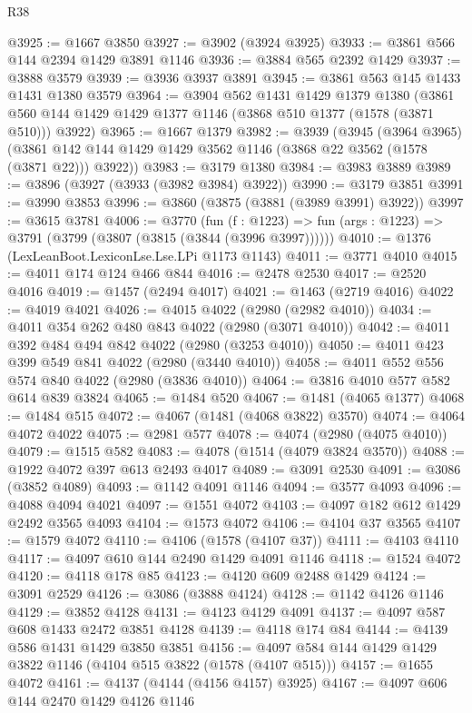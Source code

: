 \begin{lexlean}{R38}
\begin{coremodule}
@3925 := @1667 @3850
@3927 := @3902 (@3924 @3925)
@3933 := @3861 @566 @144 @2394 @1429 @3891 @1146
@3936 := @3884 @565 @2392 @1429
@3937 := @3888 @3579
@3939 := @3936 @3937 @3891
@3945 := @3861 @563 @145 @1433 @1431 @1380 @3579
@3964 := @3904
    @562
    @1431
    @1429
    @1379
    @1380
    (@3861 @560 @144 @1429 @1429 @1377 @1146 (@3868 @510 @1377 (@1578 (@3871 @510))) @3922)
@3965 := @1667 @1379
@3982 := @3939
    (@3945
      (@3964 @3965)
      (@3861 @142 @144 @1429 @1429 @3562 @1146 (@3868 @22 @3562 (@1578 (@3871 @22))) @3922))
@3983 := @3179 @1380
@3984 := @3983 @3889
@3989 := @3896 (@3927 (@3933 (@3982 @3984) @3922))
@3990 := @3179 @3851
@3991 := @3990 @3853
@3996 := @3860 (@3875 (@3881 (@3989 @3991) @3922))
@3997 := @3615 @3781
@4006 := @3770
    (fun (f : @1223) => fun (args : @1223) => @3791 (@3799 (@3807 (@3815 (@3844 (@3996 @3997))))))
@4010 := @1376 (LexLeanBoot.LexiconLse.Lse.LPi @1173 @1143)
@4011 := @3771 @4010
@4015 := @4011 @174 @124 @466 @844
@4016 := @2478 @2530
@4017 := @2520 @4016
@4019 := @1457 (@2494 @4017)
@4021 := @1463 (@2719 @4016)
@4022 := @4019 @4021
@4026 := @4015 @4022 (@2980 (@2982 @4010))
@4034 := @4011 @354 @262 @480 @843 @4022 (@2980 (@3071 @4010))
@4042 := @4011 @392 @484 @494 @842 @4022 (@2980 (@3253 @4010))
@4050 := @4011 @423 @399 @549 @841 @4022 (@2980 (@3440 @4010))
@4058 := @4011 @552 @556 @574 @840 @4022 (@2980 (@3836 @4010))
@4064 := @3816 @4010 @577 @582 @614 @839 @3824
@4065 := @1484 @520
@4067 := @1481 (@4065 @1377)
@4068 := @1484 @515
@4072 := @4067 (@1481 (@4068 @3822) @3570)
@4074 := @4064 @4072 @4022
@4075 := @2981 @577
@4078 := @4074 (@2980 (@4075 @4010))
@4079 := @1515 @582
@4083 := @4078 (@1514 (@4079 @3824 @3570))
@4088 := @1922 @4072 @397 @613 @2493 @4017
@4089 := @3091 @2530
@4091 := @3086 (@3852 @4089)
@4093 := @1142 @4091 @1146
@4094 := @3577 @4093
@4096 := @4088 @4094 @4021
@4097 := @1551 @4072
@4103 := @4097 @182 @612 @1429 @2492 @3565 @4093
@4104 := @1573 @4072
@4106 := @4104 @37 @3565
@4107 := @1579 @4072
@4110 := @4106 (@1578 (@4107 @37))
@4111 := @4103 @4110
@4117 := @4097 @610 @144 @2490 @1429 @4091 @1146
@4118 := @1524 @4072
@4120 := @4118 @178 @85
@4123 := @4120 @609 @2488 @1429
@4124 := @3091 @2529
@4126 := @3086 (@3888 @4124)
@4128 := @1142 @4126 @1146
@4129 := @3852 @4128
@4131 := @4123 @4129 @4091
@4137 := @4097 @587 @608 @1433 @2472 @3851 @4128
@4139 := @4118 @174 @84
@4144 := @4139 @586 @1431 @1429 @3850 @3851
@4156 := @4097 @584 @144 @1429 @1429 @3822 @1146 (@4104 @515 @3822 (@1578 (@4107 @515)))
@4157 := @1655 @4072
@4161 := @4137 (@4144 (@4156 @4157) @3925)
@4167 := @4097 @606 @144 @2470 @1429 @4126 @1146

\end{coremodule}
\end{lexlean}
